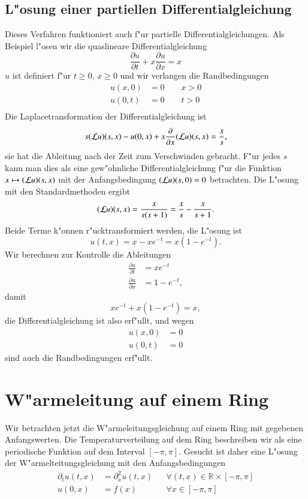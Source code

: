\subsection{L"osung einer partiellen Differentialgleichung}
Dieses Verfahren funktioniert auch f"ur partielle Differentialgleichungen.
Als Beispiel l"osen wir die quaslineare Differentialgleichung
\[
\frac{\partial u}{\partial t}+x\frac{\partial u}{\partial x}=x
\]
$u$ ist definiert f"ur $t\ge0$, $x\ge 0$ und wir verlangen die Randbedingungen
\begin{align*}
u(x,0)&=0\qquad x>0\\
u(0,t)&=0\qquad t>0\\
\end{align*}
Die Laplacetransformation der Differentialgleichung ist
\[
s({\cal L}u)(s,x)-u(0,x)+x\frac{\partial}{\partial x}({\cal L}u)(s,x)=\frac{x}{s},
\]
sie hat die Ableitung nach der Zeit zum Verschwinden gebracht. F"ur jedes
$s$ kann man dies als eine gew"ohnliche Differentialgleichung f"ur die
Funktion $x\mapsto ({\cal L}u)(s,x)$ mit der Anfangsbedingung
$({\cal L}u)(s,0)=0$ betrachten.
Die L"osung mit den Standardmethoden 
ergibt
\[
({\cal L}u)(s,x)=\frac{x}{s(s+1)}=\frac{x}{s}-\frac{x}{s+1}.
\]
Beide Terme k"onnen r"ucktransformiert werden, die L"osung ist
\[
u(t,x)=x-xe^{-t}=x(1-e^{-t}).
\]
Wir berechnen zur Kontrolle die Ableitungen
\begin{align*}
\frac{\partial u}{\partial t}
&=
xe^{-t}
\\
\frac{\partial u}{\partial x}
&=
1-e^{-t},
\end{align*}
damit 
\[
xe^{-t}+x(1-e^{-t})=x,
\]
die Differentialgleichung ist also erf"ullt, und wegen
\begin{align*}
u(x,0)
&=
0
\\
u(0,t)
&=
0
\end{align*}
sind auch die Randbedingungen erf"ullt.

\section{W"armeleitung auf einem Ring}
Wir betrachten jetzt die W"armeleitungsgleichung auf einem Ring
mit gegebenen Anfangswerten. Die Temperaturverteilung auf dem
Ring beschreiben wir als eine periodische Funktion auf dem Interval
$[-\pi,\pi]$. Gesucht ist daher eine L"osung der W"armelteitungsgleichung
mit den Anfangsbedingungen
\begin{align*}
\partial_t u(t,x)&=\partial_x^2 u(t,x) &&\forall(t,x)\in\mathbb R\times[-\pi,\pi]\\
u(0,x)&=f(x)&& \forall x\in[-\pi,\pi]\\
\end{align*}

